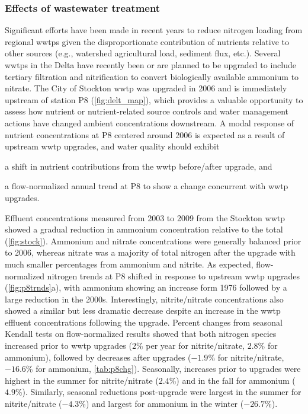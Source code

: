\documentclass[journal = esthag, manuscript = article]{achemso}\usepackage[]{graphicx}\usepackage[]{color}
\begin{document}
\subsubsection{Effects of wastewater treatment}

Significant efforts have been made in recent years to reduce nitrogen loading from regional \acp{wwtp} given the disproportionate contribution of nutrients relative to other sources (e.g., watershed agricultural load, sediment flux, etc.)\cite{Cornwell14,Novick15}.  Several \acp{wwtp} in the Delta have recently been or are planned to be upgraded to include tertiary filtration and nitrification to convert biologically available ammonium to nitrate. The City of Stockton \ac{wwtp} was upgraded in 2006 and is immediately upstream of station P8 (\cref{fig:delt_map})\cite{Jabusch16}, which provides a valuable opportunity to assess how nutrient or nutrient-related source controls and water management actions have changed ambient concentrations downstream. A modal response of nutrient concentrations at P8 centered around 2006 is expected as a result of upstream \ac{wwtp} upgrades, and water quality should exhibit \begin{inparaenum}[1\upshape)]
\item a shift in nutrient contributions from the \ac{wwtp} before/after upgrade, and
\item a flow-normalized annual trend at P8 to show a change concurrent with \ac{wwtp} upgrades.
\end{inparaenum}



Effluent concentrations measured from 2003 to 2009 from the Stockton \ac{wwtp} showed a gradual reduction in ammonium concentration relative to the total (\cref{fig:stock}).  Ammonium and nitrate concentrations were generally balanced prior to 2006, whereas nitrate was a majority of total nitrogen after the upgrade with much smaller percentages from ammonium and nitrite. As expected, flow-normalized nitrogen trends at P8 shifted in response to upstream \ac{wwtp} upgrades (\cref{fig:p8trnds}a), with ammonium showing an increase form 1976 followed by a large reduction in the 2000s.  Interestingly, nitrite/nitrate concentrations also showed a similar but less dramatic decrease despite an increase in the \ac{wwtp} effluent concentrations following the upgrade.  Percent changes from seasonal Kendall tests on flow-normalized results showed that both nitrogen species increased prior to \ac{wwtp} upgrades ($2$\% per year for nitrite/nitrate, $2.8$\% for ammonium), followed by decreases after upgrades ($-1.9$\% for nitrite/nitrate, $-16.6$\% for ammonium, \cref{tab:p8chg}).  Seasonally, increases prior to upgrades were highest in the summer for nitrite/nitrate ($2.4$\%) and in the fall for ammonium ($4.9$\%). Similarly, seasonal reductions post-upgrade were largest in the summer for nitrite/nitrate ($-4.3$\%) and largest for ammonium in the winter ($-26.7$\%).
\end{document}
